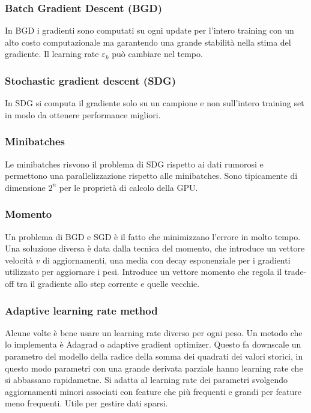 		\subsubsection{Batch Gradient Descent (BGD)}
		In BGD i gradienti sono computati su ogni update per l'intero training con un alto costo computazionale ma garantendo una grande stabilit\`a nella stima del gradiente.
		Il learning rate $\varepsilon_k$ pu\`o cambiare nel tempo.
		

		\subsubsection{Stochastic gradient descent (SDG)}
		In SDG si computa il gradiente solo su un campione e non sull'intero training set in modo da ottenere performance migliori.
		

		\subsubsection{Minibatches}
		Le minibatches risvono il problema di SDG rispetto ai dati rumorosi e permettono una parallelizzazione rispetto alle minibatches.
		Sono tipicamente di dimensione $2^n$ per le propriet\`a di calcolo della GPU.

		\subsubsection{Momento}
		Un problema di BGD e SGD \`e il fatto che minimizzano l'errore in molto tempo.
		Una soluzione diversa \`e data dalla tecnica del momento, che introduce un vettore velocit\`a $v$ di aggiornamenti, una media con decay esponenziale per i gradienti utilizzato per aggiornare i pesi.
		Introduce un vettore momento che regola il trade-off tra il gradiente allo step corrente e quelle vecchie.
		

		\subsubsection{Adaptive learning rate method}
		Alcune volte \`e bene usare un learning rate diverso per ogni peso.
		Un metodo che lo implementa \`e Adagrad o adaptive gradient optimizer.
		Questo fa downscale un parametro del modello della radice della somma dei quadrati dei valori storici, in questo modo parametri con una grande derivata parziale hanno learning rate che si abbassano rapidametne.
		Si adatta al learning rate dei parametri svolgendo aggiornamenti minori associati con feature che pi\`u frequenti e grandi per feature meno frequenti.
		Utile per gestire dati sparsi.
		

